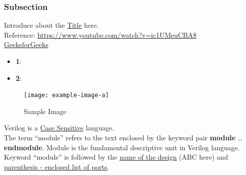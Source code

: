 \documentclass[12pt, a4paper]{article}
\begin{document}
\subsubsection{Subsection}

Introduce about the \underline{Title} here. \\

Reference: \url{https://www.youtube.com/watch?v=ic1UMeuCBA8} \\
\href{https://www.geeksforgeeks.org/difference-between-gate-level-and-structural-verilog-hdl/}{GeeksforGeeks}

\begin{itemize}
    \item \textbf{1}: 
    \item \textbf{2}:   
\end{itemize}

\begin{figure}[h]   %
    \centering
    \texttt{[image: example-image-a]} %
    \caption{Sample Image}%
    \label{fig:veri1}
\end{figure}

Verilog is a \underline{Case Sensitive} language. \\
The term ``module'' refers to the text enclosed by the keyword pair \textbf{module} \ldots \textbf{endmodule}. Module is the fundamental descriptive unit in Verilog language. \\
Keyword ``module'' is followed by the \underline{name of the design} (ABC here) and \uline{parenthesis - enclosed list of ports}.\\
\end{document}
